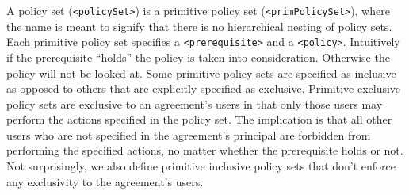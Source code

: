 \documentclass[runningheads,a4paper]{llncs}
\newcommand{\syn}{\texttt}
\begin{document}
A policy set (\syn{<policySet>}) is a primitive policy set
(\syn{<primPolicySet>}), where the name is meant to signify that there
is no hierarchical nesting of policy sets. Each primitive policy set
specifies a \syn{<prerequisite>} and a \syn{<policy>}. Intuitively if
the prerequisite ``holds'' the policy is taken into
consideration. Otherwise the policy will not be looked at. Some
primitive policy sets are specified as inclusive as opposed to others
that are explicitly specified as exclusive. Primitive exclusive policy
sets are exclusive to an agreement's users in that only those users
may perform the actions specified in the policy set. The implication
is that all other users who are not specified in the agreement's
principal are forbidden from performing the specified actions, no
matter whether the prerequisite holds or not. Not surprisingly, we also
define primitive inclusive policy sets that don't enforce any
exclusivity to the agreement's users.
\end{document}
